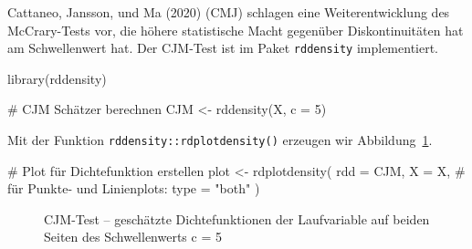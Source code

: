 \documentclass[
  a4paper,
  DIV=11,
  oneside]{scrreprt}
\newenvironment{Shaded}{\begin{snugshade}}{\end{snugshade}}
\newcommand{\AttributeTok}[1]{\textcolor[rgb]{0.40,0.45,0.13}{#1}}
\newcommand{\CommentTok}[1]{\textcolor[rgb]{0.37,0.37,0.37}{#1}}
\newcommand{\DecValTok}[1]{\textcolor[rgb]{0.68,0.00,0.00}{#1}}
\newcommand{\FunctionTok}[1]{\textcolor[rgb]{0.28,0.35,0.67}{#1}}
\newcommand{\NormalTok}[1]{\textcolor[rgb]{0.00,0.23,0.31}{#1}}
\newcommand{\OtherTok}[1]{\textcolor[rgb]{0.00,0.23,0.31}{#1}}
\newcommand{\StringTok}[1]{\textcolor[rgb]{0.13,0.47,0.30}{#1}}
\begin{document}
Cattaneo, Jansson, und Ma (2020) (CMJ) schlagen eine Weiterentwicklung
des McCrary-Tests vor, die höhere statistische Macht gegenüber
Diskontinuitäten hat am Schwellenwert hat. Der CJM-Test ist im Paket
\texttt{rddensity} implementiert.

\begin{Shaded}
\begin{Highlighting}[]
\FunctionTok{library}\NormalTok{(rddensity)}

\CommentTok{\# CJM Schätzer berechnen}
\NormalTok{CJM }\OtherTok{\textless{}{-}} \FunctionTok{rddensity}\NormalTok{(X, }\AttributeTok{c =} \DecValTok{5}\NormalTok{)}
\end{Highlighting}
\end{Shaded}

Mit der Funktion \texttt{rddensity::rdplotdensity()} erzeugen wir
Abbildung~\ref{fig-cjmtsim}.

\begin{Shaded}
\begin{Highlighting}[]
\CommentTok{\# Plot für Dichtefunktion erstellen}
\NormalTok{plot }\OtherTok{\textless{}{-}} \FunctionTok{rdplotdensity}\NormalTok{(}
  \AttributeTok{rdd =}\NormalTok{ CJM, }
  \AttributeTok{X =}\NormalTok{ X, }
  \CommentTok{\# für Punkte{-} und Linienplots:}
  \AttributeTok{type =} \StringTok{"both"} 
\NormalTok{)}
\end{Highlighting}
\end{Shaded}

\begin{figure}[t]


\caption{\label{fig-cjmtsim}CJM-Test -- geschätzte Dichtefunktionen der
Laufvariable auf beiden Seiten des Schwellenwerts c = 5}

\end{figure}%
\end{document}
